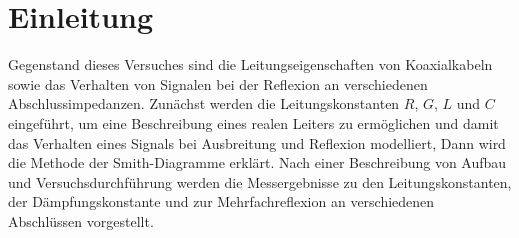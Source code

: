

\section{Einleitung}
Gegenstand dieses Versuches sind die Leitungseigenschaften von Koaxialkabeln sowie 
das Verhalten von Signalen bei der Reflexion an verschiedenen Abschlussimpedanzen. 
Zunächst werden die Leitungskonstanten $R$, $G$, $L$ und $C$ eingeführt, um eine 
Beschreibung eines realen Leiters zu ermöglichen und damit das Verhalten eines 
Signals bei Ausbreitung und Reflexion modelliert, Dann wird die Methode der 
Smith-Diagramme erklärt. Nach einer Beschreibung von Aufbau und Versuchsdurchführung 
werden die Messergebnisse zu den Leitungskonstanten, der Dämpfungskonstante und zur 
Mehrfachreflexion an verschiedenen Abschlüssen vorgestellt.